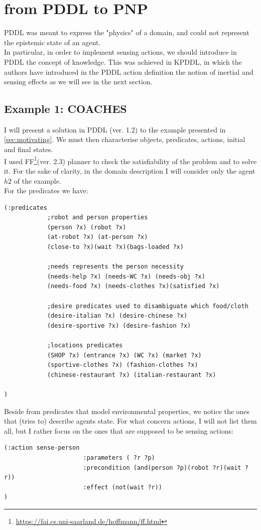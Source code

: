 \documentclass[pdftex,12pt,a4paper]{report}
\begin{document}
\section{from PDDL to PNP}
\noindent PDDL was meant to express the "physics" of a domain, and could not represent the epistemic state of an agent.\\
In particular, in order to implement sensing actions, we should introduce in PDDL the concept of knowledge. This was achieved in KPDDL, in which the authors have introduced in the PDDL action definition the notion of inertial and sensing effects as we will see in the next section.

\subsection{Example 1: COACHES}
I will present a solution in PDDL (ver. 1.2) to the example presented in \ref{sec:motivating}.
We must then characterise objects, predicates, actions, initial and final states.\\
I used FF\cite{hoffmann:nebel:jair-01}\footnote{\url{https://fai.cs.uni-saarland.de/hoffmann/ff.html}}(ver. 2.3)  planner to check the satisfiability of the problem and to solve it.
For the sake of clarity, in the domain description I will consider only the agent $h2$ of the example. \\

\noindent For the predicates we have:
\begin{verbatim}
(:predicates
            ;robot and person properties
            (person ?x) (robot ?x)
            (at-robot ?x) (at-person ?x)
            (close-to ?x)(wait ?x)(bags-loaded ?x)

            ;needs represents the person necessity
            (needs-help ?x) (needs-WC ?x) (needs-obj ?x)
            (needs-food ?x) (needs-clothes ?x)(satisfied ?x)

            ;desire predicates used to disambiguate which food/cloth
            (desire-italian ?x) (desire-chinese ?x)
            (desire-sportive ?x) (desire-fashion ?x)

            ;locations predicates
            (SHOP ?x) (entrance ?x) (WC ?x) (market ?x)
            (sportive-clothes ?x) (fashion-clothes ?x)
            (chinese-restaurant ?x) (italian-restaurant ?x)

)
\end{verbatim}
Beside from predicates that model environmental properties, we notice the ones that (tries to) describe agents state. 
\noindent For what concern actions, I will not list them all, but I rather focus on the ones that are supposed to be sensing actions:
\begin{verbatim}
(:action sense-person
                      :parameters ( ?r ?p)
                      :precondition (and(person ?p)(robot ?r)(wait ?r))
                      :effect (not(wait ?r))
)
\end{verbatim}
\end{document}
